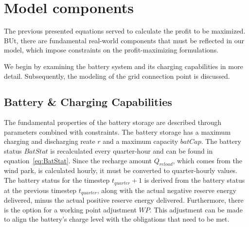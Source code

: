
\section{Model components}
\label{chap:model_components}
The previous presented equations served to calculate the profit to be maximized.
BUt, there are fundamental real-world components that must be reflected in our model,
which impose constraints on the profit-maximizing formulations.

We begin by examining the battery system and its charging capabilities in more detail.
Subsequently, the modeling of the grid connection point is discussed.

\subsection{Battery \& Charging Capabilities}
The fundamental properties of the battery storage are described through parameters combined with constraints.
The battery storage has a maximum charging and discharging reate $r$ and a maximum capacity $batCap$.
The battery status $BatStat$ is recalculated every quarter-hour and can be found in equation~\ref{eq:BatStat}.
Since the recharge amount $Q_{reload}$, which comes from the wind park, is calculated hourly,
it must be converted to quarter-hourly values. The battery status for the timestep $t_{quarter} + 1$
is derived from the battery status at the previous timestep $t_{quarter}$, along with the actual negative reserve energy delivered,
minus the actual positive reserve energy delivered. Furthermore, there is the option for a working point adjustment $WP$.
This adjustment can be made to align the battery's charge level with the obligations that need to be met.

